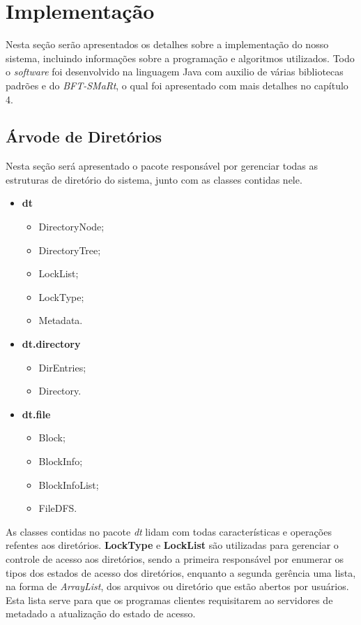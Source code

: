 
\section{Implementação}
Nesta seção serão apresentados os detalhes sobre a implementação do nosso sistema, incluindo informações sobre a programação e algoritmos utilizados. Todo o \textit{software} foi desenvolvido na linguagem Java com auxilio de várias bibliotecas padrões e do \textit{BFT-SMaRt}, o qual foi apresentado com mais detalhes no capítulo 4. 
\\


\subsection{Árvode de Diretórios}
Nesta seção será apresentado o pacote responsável por gerenciar todas as estruturas de diretório do sistema, junto com as classes contidas nele.
\\

\begin{itemize}
	\item \textbf{dt}
	\begin{itemize}
		\item DirectoryNode;
		\item DirectoryTree;
		\item LockList;
		\item LockType;
		\item Metadata.
	\end{itemize}
	\item \textbf{dt.directory}
	\begin{itemize}
		\item DirEntries;
		\item Directory.
	\end{itemize}
	\item \textbf{dt.file}
	\begin{itemize}
		\item Block;
		\item BlockInfo;
		\item BlockInfoList;
		\item FileDFS.
	\end{itemize}
\end{itemize}

As classes contidas no pacote \textit{dt} lidam com todas características e operações refentes aos diretórios. \textbf{LockType} e \textbf{LockList} são utilizadas para gerenciar o controle de acesso aos diretórios, sendo a primeira responsável por enumerar os tipos dos estados de acesso dos diretórios, enquanto a segunda gerência uma lista, na forma de \textit{ArrayList}, dos arquivos ou diretório que estão abertos por usuários.
Esta lista serve para que os programas clientes requisitarem ao servidores de metadado a atualização do estado de acesso. 
\\

